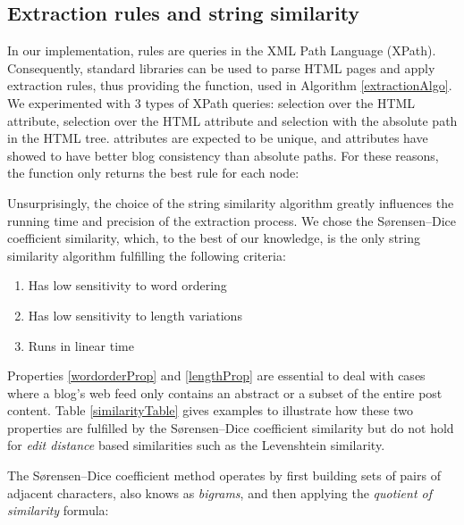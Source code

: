 \subsection{Extraction rules and string similarity}
In our implementation, rules are queries in the XML Path Language (XPath). Consequently, standard libraries can be used to parse HTML pages and apply extraction rules, thus providing the  function, used in Algorithm \ref{extractionAlgo}. We experimented with 3 types of XPath queries: selection over the HTML  attribute, selection over the HTML  attribute and selection with the absolute path in the HTML tree.  attributes are expected to be unique, and  attributes have showed to have better blog consistency than absolute paths. For these reasons, the  function only returns the best rule for each node:

\allrulesAlgo

Unsurprisingly, the choice of the string similarity algorithm greatly influences the running time and precision of the extraction process. We chose the Sørensen–Dice coefficient similarity\cite{dice1945}, which, to the best of our knowledge, is the only string similarity algorithm fulfilling the following criteria:

\begin{enumerate}
  \item\label{wordorderProp} Has low sensitivity to word ordering
  \item\label{lengthProp} Has low sensitivity to length variations
  \item\label{linearProp} Runs in linear time
\end{enumerate}

Properties \ref{wordorderProp} and \ref{lengthProp} are essential to deal with cases where a blog's web feed only contains an abstract or a subset of the entire post content. Table \ref{similarityTable} gives examples to illustrate how these two properties are fulfilled by the Sørensen–Dice coefficient similarity but do not hold for \emph{edit distance} based similarities such as the Levenshtein\cite{levenshtein1966} similarity.

\similarityTable

The Sørensen–Dice coefficient method operates by first building sets of pairs of adjacent characters, also knows as \emph{bigrams}, and then applying the \emph{quotient of similarity} formula:

